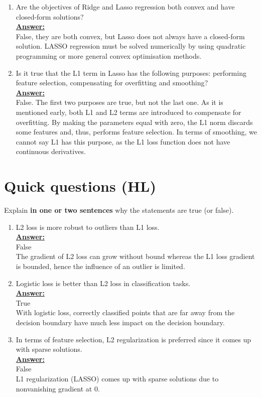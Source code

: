 \documentclass{article}
\newenvironment{qparts}{\begin{enumerate}[1.]}{\end{enumerate}}
\begin{document}
\begin{qparts}
\item Are the objectives of Ridge and Lasso regression both convex and have closed-form solutions?\\
\underline{\textbf{Answer:}}\\
False, they are both convex, but Lasso does not always have a closed-form solution. LASSO regression must be solved numerically by using quadratic programming or more general convex optimisation methods.

\item Is it true that the L1 term in Lasso has the following purposes: performing feature selection, compensating for overfitting and smoothing?\\
\underline{\textbf{Answer:}}\\
False. The first two purposes are true, but not the last one. As it is mentioned early, both L1 and L2 terms are introduced to compensate for overfitting. By making the parameters equal with zero, the L1 norm discards some features and, thus, performs feature selection. In terms of smoothing, we cannot say L1 has this purpose, as the L1 loss function does not have continuous derivatives.
\end{qparts}


\newpage
\section{Quick questions (HL)}
Explain \textbf{in one or two sentences} why the statements are true (or false).
\begin{qparts}
\item L2 loss is more robust to outliers than L1 loss.\\
\underline{\textbf{Answer:}}\\
False \\
The gradient of L2 loss can grow without bound whereas the L1 loss gradient is bounded, hence the influence of an outlier is limited.

\item Logistic loss is better than L2 loss in classification tasks.\\
\underline{\textbf{Answer:}}\\
True \\ 
With logistic loss, correctly classified points that are far away from the decision boundary have much less impact on the decision boundary.


\item In terms of feature selection, L2 regularization is preferred since it comes up with sparse solutions.\\
\underline{\textbf{Answer:}}\\
False \\
L1 regularization (LASSO) comes up with sparse solutions due to nonvanishing gradient at 0.
\end{qparts}
\end{document}
